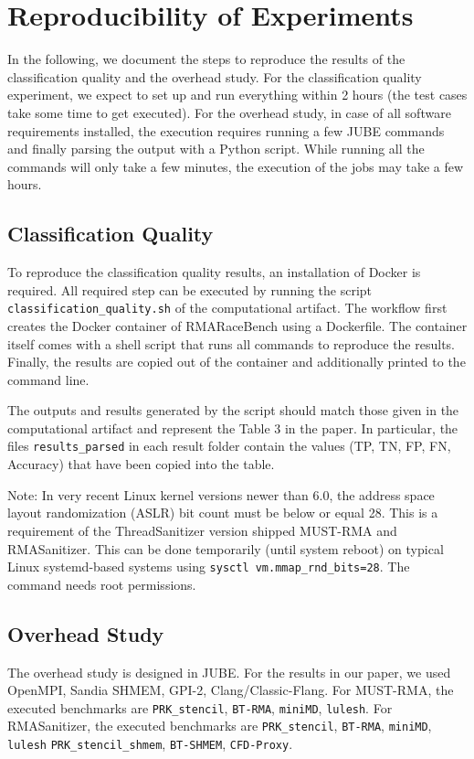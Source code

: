 \documentclass[twoside]{article}
\begin{document}

\section*{Reproducibility of Experiments}

In the following, we document the steps to reproduce the results of the classification quality and the overhead study.
For the classification quality experiment, we expect to set up and run everything within 2 hours (the test cases take some time to get executed).
For the overhead study, in case of all software requirements installed, the execution requires running a few JUBE commands and finally parsing the output with a Python script. While running all the commands will only take a few minutes, the execution of the jobs may take a few hours.

\subsection*{Classification Quality}
To reproduce the classification quality results, an installation of Docker is required.
All required step can be executed by running the script \texttt{classification\_quality.sh} of the computational artifact.
The workflow first creates the Docker container of RMARaceBench using a Dockerfile.
The container itself comes with a shell script that runs all commands to reproduce the results.
Finally, the results are copied out of the container and additionally printed to the command line.

The outputs and results generated by the script should match those given in the computational artifact and represent the Table 3 in the paper.
In particular, the files \texttt{results\_parsed} in each result folder contain the values (TP, TN, FP, FN, Accuracy) that have been copied into the table.

Note: In very recent Linux kernel versions newer than 6.0, the address space layout randomization (ASLR) bit count must be below or equal 28. This is a requirement of the ThreadSanitizer version shipped MUST-RMA and RMASanitizer. This can be done temporarily (until system reboot) on typical Linux systemd-based systems using \texttt{sysctl vm.mmap\_rnd\_bits=28}. The command needs root permissions. 


\subsection*{Overhead Study}
The overhead study is designed in JUBE.
For the results in our paper, we used OpenMPI, Sandia SHMEM, GPI-2, Clang/Classic-Flang.
For MUST-RMA, the executed benchmarks are \texttt{PRK\_stencil}, \texttt{BT-RMA}, \texttt{miniMD}, \texttt{lulesh}.
For RMASanitizer, the executed benchmarks are \texttt{PRK\_stencil}, \texttt{BT-RMA},  \texttt{miniMD}, \texttt{lulesh} \texttt{PRK\_stencil\_shmem}, \texttt{BT-SHMEM}, \texttt{CFD-Proxy}.
\end{document}
